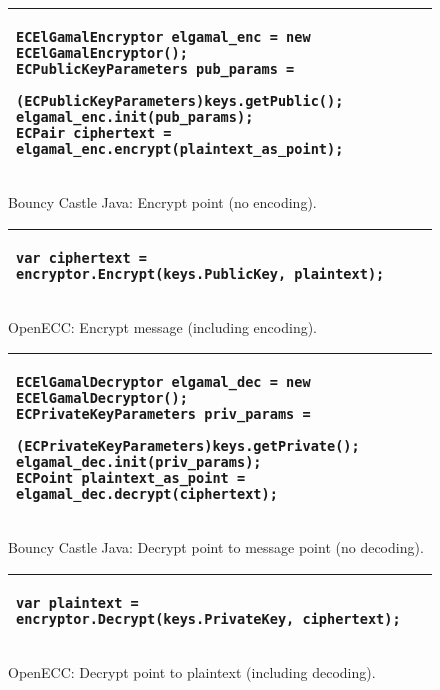 \begin{figure}[h!]
    \begin{tabular}{|p{\textwidth}|}
    \hline
    \begin{verbatim}
ECElGamalEncryptor elgamal_enc = new ECElGamalEncryptor();
ECPublicKeyParameters pub_params =
                         (ECPublicKeyParameters)keys.getPublic();
elgamal_enc.init(pub_params);
ECPair ciphertext = elgamal_enc.encrypt(plaintext_as_point);
    \end{verbatim} \\
    \hline
    \end{tabular}
    \caption{Bouncy Castle Java: Encrypt point (no encoding).}
\end{figure}

\begin{figure}[h!]
    \begin{tabular}{|p{\textwidth}|}
    \hline
    \begin{verbatim}
var ciphertext = encryptor.Encrypt(keys.PublicKey, plaintext);
    \end{verbatim} \\
    \hline
    \end{tabular}
    \caption{OpenECC: Encrypt message (including encoding).}
\end{figure}

\begin{figure}[h!]
    \begin{tabular}{|p{\textwidth}|}
    \hline
    \begin{verbatim}
ECElGamalDecryptor elgamal_dec = new ECElGamalDecryptor();
ECPrivateKeyParameters priv_params =
                       (ECPrivateKeyParameters)keys.getPrivate();
elgamal_dec.init(priv_params);
ECPoint plaintext_as_point = elgamal_dec.decrypt(ciphertext);
    \end{verbatim} \\
    \hline
    \end{tabular}
    \caption{Bouncy Castle Java: Decrypt point to message point (no decoding).}
\end{figure}

\begin{figure}[h!]
    \begin{tabular}{|p{\textwidth}|}
    \hline
    \begin{verbatim}
var plaintext = encryptor.Decrypt(keys.PrivateKey, ciphertext);
    \end{verbatim} \\
    \hline
    \end{tabular}
    \caption{OpenECC: Decrypt point to plaintext (including decoding).}
\end{figure}